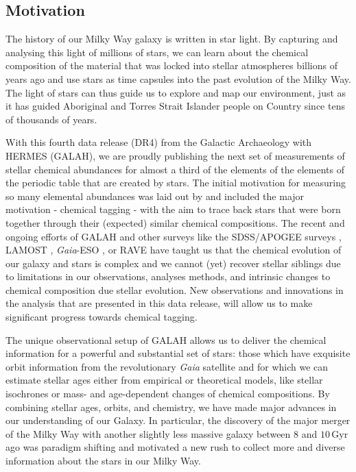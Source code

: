 \documentclass[
  journal=pasa,
  manuscript=research-paper, %
  year=2023,
  volume=37
]{cup-journal}
\newcommand{\Gaia}{\textit{Gaia}\xspace}
\begin{document}
\subsection{Motivation} \label{sec:motivation}

The history of our Milky Way galaxy is written in star light. By capturing and analysing this light of millions of stars, we can learn about the chemical composition of the material that was locked into stellar atmospheres billions of years ago and use stars as time capsules into the past evolution of the Milky Way. The light of stars can thus guide us to explore and map our environment, just as it has guided Aboriginal and Torres Strait Islander people on Country since tens of thousands of years.

With this fourth data release (DR4) from the Galactic Archaeology with HERMES (GALAH), we are proudly publishing the next set of measurements of stellar chemical abundances for almost a third of the elements of the elements of the periodic table that are created by stars. The initial motivation for measuring so many elemental abundances was laid out by \citet{DeSilva2015} and included the major motivation - chemical tagging - with the aim to trace back stars that were born together through their (expected) similar chemical compositions. The recent and ongoing efforts of GALAH and other surveys like the SDSS/APOGEE surveys \citep[e.g.][]{SDSSDR17, Kollmeier2017}, LAMOST \citep{Zhao2012}, \Gaia-ESO \citep{Gilmore2022}, or RAVE \citep{Steinmetz2020a} have taught us that the chemical evolution of our galaxy and stars is complex and we cannot (yet) recover stellar siblings due to limitations in our observations, analyses methods, and intrinsic changes to chemical composition due stellar evolution. New observations and innovations in the analysis that are presented in this data release, will allow us to make significant progress towards chemical tagging.

The unique observational setup of GALAH allows us to deliver the chemical information for a powerful and substantial set of stars: those which have exquisite orbit information from the revolutionary \Gaia satellite \citep{Gaia-Collaboration2016} and for which we can estimate stellar ages either from empirical or theoretical models, like stellar isochrones or mass- and age-dependent changes of chemical compositions. By combining stellar ages, orbits, and chemistry, we have made major advances in our understanding of our Galaxy. In particular, the discovery of the major merger of the Milky Way with another slightly less massive galaxy between 8 and $10\,\mathrm{Gyr}$ ago \citep{Belokurov2018, Helmi2018} was paradigm shifting and motivated a new rush to collect more and diverse information about the stars in our Milky Way.
\end{document}
